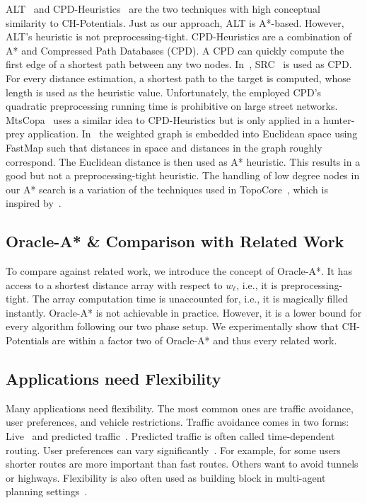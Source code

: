 \documentclass[letterpaper]{article} %
\begin{document}
ALT~\cite{gh-cspas-05} and CPD-Heuristics~\cite{DBLP:conf/ijcai/BonoGHS19} are the two techniques with high conceptual similarity to CH-Potentials.
Just as our approach, ALT is A*-based.
However, ALT's heuristic is not preprocessing-tight.
%
CPD-Heuristics are a combination of A* and Compressed Path Databases (CPD).
A CPD can quickly compute the first edge of a shortest path between any two nodes.
In~\cite{DBLP:conf/ijcai/BonoGHS19}, SRC~\cite{DBLP:conf/socs/StrasserHB14} is used as CPD.
For every distance estimation, a shortest path to the target is computed, whose length is used as the heuristic value. %
Unfortunately, the employed CPD's quadratic preprocessing running time is prohibitive on large street networks.
%
MtsCopa~\cite{DBLP:journals/tciaig/BaierBHH15} uses a similar idea to CPD-Heuristics but is only applied in a hunter-prey application.
%
In~\cite{DBLP:conf/ijcai/0002UJAKK18} the weighted graph is embedded into Euclidean space using FastMap such that distances in space and distances in the graph roughly correspond.
The Euclidean distance is then used as A* heuristic.
This results in a good but not a preprocessing-tight heuristic.
%
The handling of low degree nodes in our A* search is a variation of the techniques used in TopoCore~\cite{DBLP:conf/gis/DibbeltSW15}, which is inspired by~\cite{DBLP:journals/pvldb/FunkeNS14}.

\subsection{Oracle-A* \& Comparison with Related Work}
\label{sec:oracle}

To compare against related work, we introduce the concept of Oracle-A*.
It has access to a shortest distance array with respect to $w_\ell$, i.e., it is preprocessing-tight.
The array computation time is unaccounted for, i.e., it is magically filled instantly.
Oracle-A* is not achievable in practice.
However, it is a lower bound for every algorithm following our two phase setup.
We experimentally show that CH-Potentials are within a factor two of Oracle-A* and thus every related work.

\subsection{Applications need Flexibility}

Many applications need flexibility.
The most common ones are traffic avoidance, user preferences, and vehicle restrictions.
Traffic avoidance comes in two forms: Live~\cite{dgpw-crprn-13,dsw-cch-15} and predicted traffic~\cite{ndls-bastd-12,bgsv-mtdtt-13}.
Predicted traffic is often called time-dependent routing.
%
User preferences can vary significantly~\cite{DBLP:conf/gis/FunkeS15,DBLP:conf/gis/DellingGGKTW15,DBLP:conf/gis/FunkeLS16}.
For example, for some users shorter routes are more important than fast routes.
Others want to avoid tunnels or highways.
%
Flexibility is also often used as building block in multi-agent planning settings~\cite{DBLP:journals/ai/SharonSFS15,DBLP:journals/tciaig/BaierBHH15}.
%
\end{document}
